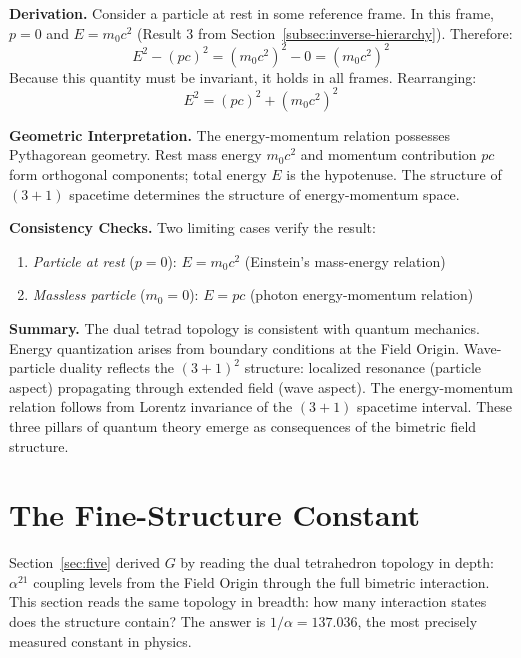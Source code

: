 \documentclass[aps,prd,preprint,superscriptaddress,showpacs,preprintnumbers,amsmath,amssymb,nofootinbib]{revtex4-2}
\begin{document}
\textbf{Derivation.}
Consider a particle at rest in some reference frame. In this frame, $p = 0$ and $E = m_0 c^2$ (Result 3 from Section~\ref{subsec:inverse-hierarchy}). Therefore:
\begin{equation}
E^2 - (pc)^2 = (m_0 c^2)^2 - 0 = (m_0 c^2)^2
\end{equation}
Because this quantity must be invariant, it holds in all frames. Rearranging:
\begin{equation}
E^2 = (pc)^2 + (m_0 c^2)^2
\end{equation}

\textbf{Geometric Interpretation.}
The energy-momentum relation possesses Pythagorean geometry. Rest mass energy $m_0 c^2$ and momentum contribution $pc$ form orthogonal components; total energy $E$ is the hypotenuse. The structure of $(3+1)$ spacetime determines the structure of energy-momentum space.

\textbf{Consistency Checks.}
Two limiting cases verify the result:
\begin{enumerate}
    \item \emph{Particle at rest} ($p = 0$): $E = m_0 c^2$ (Einstein's mass-energy relation)
    \item \emph{Massless particle} ($m_0 = 0$): $E = pc$ (photon energy-momentum relation)
\end{enumerate}

\textbf{Summary.}
The dual tetrad topology is consistent with quantum mechanics. Energy quantization arises from boundary conditions at the Field Origin. Wave-particle duality reflects the $(3+1)^2$ structure: localized resonance (particle aspect) propagating through extended field (wave aspect). The energy-momentum relation follows from Lorentz invariance of the $(3+1)$ spacetime interval. These three pillars of quantum theory emerge as consequences of the bimetric field structure.

\section{The Fine-Structure Constant}
\label{sec:alpha}

Section~\ref{sec:five} derived $G$ by reading the dual tetrahedron topology in depth: $\alpha^{21}$ coupling levels from the Field Origin through the full bimetric interaction. This section reads the same topology in breadth: how many interaction states does the structure contain? The answer is $1/\alpha = 137.036$, the most precisely measured constant in physics.
\end{document}
